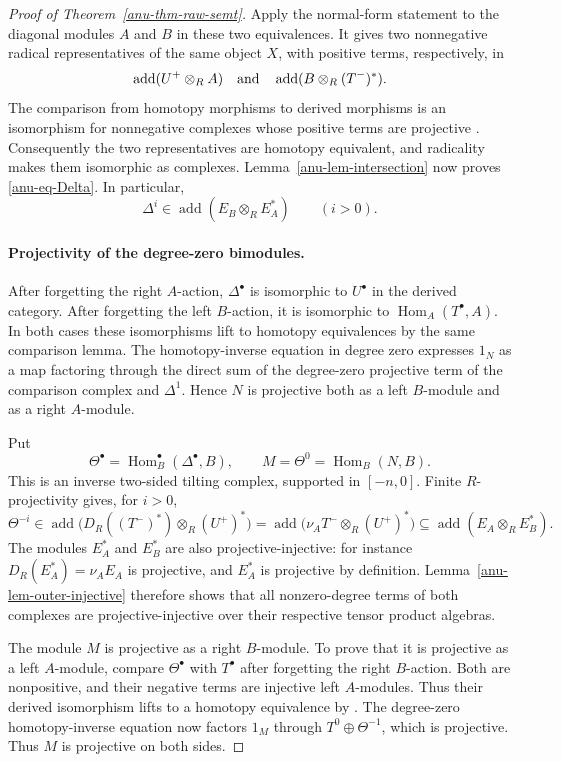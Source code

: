 \documentclass[12pt,a4paper,english,reqno]{amsart}
\numberwithin{equation}{section}
\theoremstyle{plain}
\theoremstyle{definition}
\begin{document}
\begin{proof}[Proof of Theorem~\ref{anu-thm-raw-semt}]
Apply the normal-form statement
\cite[Lemma~3.1]{HuXi2010} to the diagonal modules $A$ and $B$
in these two equivalences.  It gives two nonnegative radical
representatives of the same object $X$, with positive terms,
respectively, in
\[
 \operatorname{add}(U^+\otimes_RA)
 \quad\hbox{and}\quad
 \operatorname{add}(B\otimes_R(T^-)^*).
\]
The comparison from homotopy morphisms to derived morphisms is an
isomorphism for nonnegative complexes whose positive terms are
projective \cite[Lemma~2.2(1), p.~114]{HuXi2010}.
Consequently the two representatives are homotopy equivalent,
and radicality makes them isomorphic as complexes.
Lemma~\ref{anu-lem-intersection} now proves
\eqref{anu-eq-Delta}.
In particular,
\begin{equation}\label{anu-eq-positive-support}
 \Delta^i\in\operatorname{add}(E_B\otimes_RE_A^*)
 \qquad(i>0).
\end{equation}

\paragraph{Projectivity of the degree-zero bimodules.}
After forgetting the right $A$-action, $\Delta^\bullet$ is
isomorphic to $U^\bullet$ in the derived category.  After forgetting
the left $B$-action, it is isomorphic to
$\operatorname{Hom}_A(T^\bullet,A)$.
In both cases these isomorphisms lift to homotopy equivalences by
the same comparison lemma.  The homotopy-inverse equation in
degree zero expresses $1_N$ as a map factoring through the direct
sum of the degree-zero projective term of the comparison complex
and $\Delta^1$.  Hence $N$ is projective both as a left $B$-module
and as a right $A$-module.

Put
\[
 \Theta^\bullet=\operatorname{Hom}_B^\bullet(\Delta^\bullet,B),
 \qquad M=\Theta^0=\operatorname{Hom}_B(N,B).
\]
This is an inverse two-sided tilting complex, supported in
$[-n,0]$.  Finite $R$-projectivity gives, for $i>0$,
\[
 \Theta^{-i}\in
 \operatorname{add}\bigl(D_R((T^-)^*)\otimes_R(U^+)^*\bigr)
 =\operatorname{add}\bigl(\nu_AT^-\otimes_R(U^+)^*\bigr)
 \subseteq\operatorname{add}(E_A\otimes_RE_B^*).
\]
The modules $E_A^*$ and $E_B^*$ are also projective-injective:
for instance $D_R(E_A^*)=\nu_AE_A$ is projective, and $E_A^*$
is projective by definition.  Lemma~\ref{anu-lem-outer-injective}
therefore shows that all nonzero-degree terms of both complexes
are projective-injective over their respective tensor product
algebras.

The module $M$ is projective as a right $B$-module.  To prove that
it is projective as a left $A$-module, compare $\Theta^\bullet$ with $T^\bullet$ after
forgetting the right $B$-action.  Both are nonpositive, and their
negative terms are injective left $A$-modules.  Thus their derived
isomorphism lifts to a homotopy equivalence by
\cite[Lemma~2.2(2)]{HuXi2010}.
The degree-zero homotopy-inverse equation now factors $1_M$
through $T^0\oplus\Theta^{-1}$, which is projective.
Thus $M$ is projective on both sides.


\end{proof}
\end{document}
